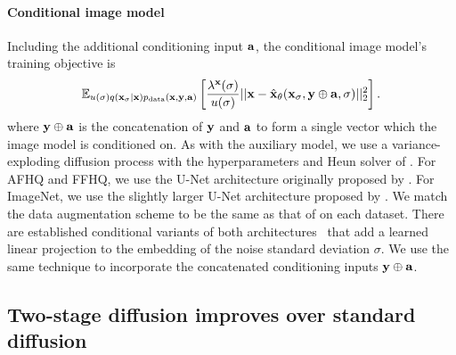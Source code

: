 \paragraph{Conditional image model}
Including the additional conditioning input ${\mathbf{a}}$, the conditional image model's training objective is
\begin{equation}
\label{eq:conditional-image-model-objective}
    \mathbb{E}_{u(\sigma)q({\mathbf{x}}_\sigma|{\mathbf{x}})p_{\rm{data}}({\mathbf{x}},{\mathbf{y}},{\mathbf{a}})} \left[ \frac{\lambda^{\mathbf{x}}(\sigma)}{u(\sigma)} \lvert\lvert {\mathbf{x}} - \hat{{\mathbf{x}}}_\theta({\mathbf{x}}_\sigma, {\mathbf{y}} \oplus {\mathbf{a}}, \sigma) \rvert\rvert_2^2 \right].
\end{equation}
where ${\mathbf{y}} \oplus {\mathbf{a}}$ is the concatenation of ${\mathbf{y}}$ and ${\mathbf{a}}$ to form a single vector which the image model is conditioned on. As with the auxiliary model, we use a variance-exploding diffusion process with the hyperparameters and Heun solver of \citet{karras2022elucidating}. For AFHQ and FFHQ, we use the U-Net architecture originally proposed by \citet{song2020score}. For ImageNet, we use the slightly larger U-Net architecture proposed by \citet{dhariwal2021diffusion}. We match the data augmentation scheme to be the same as that of \citet{karras2022elucidating} on each dataset. There are established conditional variants of both architectures~\citep{dhariwal2021diffusion,karras2022elucidating} that add a learned linear projection to the embedding of the noise standard deviation $\sigma$.  We use the same technique to incorporate the concatenated conditioning inputs ${\mathbf{y}}\oplus{\mathbf{a}}$.

\subsection{Two-stage diffusion improves over standard diffusion} \label{sec:2sdm-experiments}


